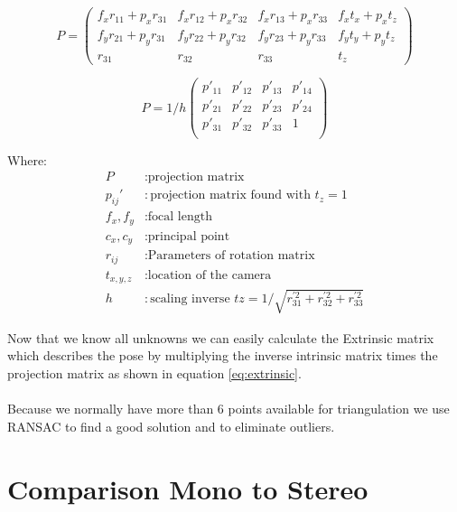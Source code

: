 \documentclass[11pt,a4paper,titlepage,oneside]{report}
\begin{document}
\begin{equation}\label{eq:ext_int}
	P=
	\begin{pmatrix}
		f_xr_{11}+p_xr_{31} & f_xr_{12}+p_xr_{32} & f_xr_{13}+p_xr_{33} & f_xt_x+p_xt_z\\
		f_yr_{21}+p_yr_{31} & f_yr_{22}+p_yr_{32} & f_yr_{23}+p_yr_{33} & f_yt_y+p_yt_z\\
		r_{31} & r_{32} & r_{33} & t_z
	\end{pmatrix}
\end{equation}

\begin{equation}\label{eq:ext_int_scaled}
	P=1/h
	\begin{pmatrix}
		p'_{11} & p'_{12} & p'_{13} & p'_{14}\\
		p'_{21} & p'_{22} & p'_{23} & p'_{24}\\
		p'_{31} & p'_{32} & p'_{33} & 1\\
	\end{pmatrix}
\end{equation}

Where:
\begin{align*}
	P					&: \text{projection matrix}\\
	p_{ij}'		&: \text{projection matrix found with $t_z=1$}\\
	f_x,f_y		&: \text{focal length}\\
	c_x,c_y		&: \text{principal point}\\
	r_{ij}		&: \text{Parameters of rotation matrix}\\
	t_{x,y,z}	&: \text{location of the camera}\\
	h					&: \text{scaling inverse $tz=1/\sqrt{r_{31}^{'2}+r_{32}^{'2}+r_{33}^{'2}}$}
\end{align*}


Now that we know all unknowns we can easily calculate the Extrinsic matrix which describes the pose by multiplying the inverse intrinsic matrix times the projection matrix as shown in equation \ref{eq:extrinsic}.\\\\

Because we normally have more than 6 points available for triangulation we use RANSAC \cite{ransac} to find a good solution and to eliminate outliers.

\section{Comparison Mono to Stereo}\label{sec:monster}
\end{document}
